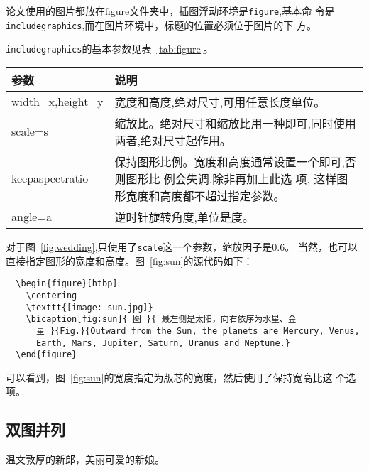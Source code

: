 论文使用的图片都放在figure文件夹中，插图浮动环境是\texttt{figure},基本命
令是\texttt{includegraphics},而在图片环境中，标题的位置必须位于图片的下
方。

\texttt{includegraphics}的基本参数见表~\ref{tab:figure}。

\begin{table}[htbp]
  \centering
  \vspace{0.2cm}
  \zhongwu
  \begin{tabularx}{0.8\textwidth{}}{lX}
    \toprule
    参数             & 说明 \\
    \midrule
    width=x,height=y & 宽度和高度,绝对尺寸,可用任意长度单位。                           \\
    scale=s          & 缩放比。绝对尺寸和缩放比用一种即可,同时使用两者,绝对尺寸起作用。 \\
    keepaspectratio & 保持图形比例。宽度和高度通常设置一个即可,否则图形比
    例会失调,除非再加上此选 项,
    这样图形宽度和高度都不超过指定参数。                                                \\
    angle=a          & 逆时针旋转角度,单位是度。                                        \\
    \bottomrule
  \end{tabularx}
\end{table}

对于图~\ref{fig:wedding},只使用了\texttt{scale}这一个参数，缩放因子是0.6。
当然，也可以直接指定图形的宽度和高度。图~\ref{fig:sun}的源代码如下：

\begin{lstlisting}
  \begin{figure}[htbp]
    \centering
    \texttt{[image: sun.jpg]}
    \bicaption[fig:sun]{ 图 }{ 最左侧是太阳，向右依序为水星、金
      星 }{Fig.}{Outward from the Sun, the planets are Mercury, Venus,
      Earth, Mars, Jupiter, Saturn, Uranus and Neptune.}
  \end{figure}
\end{lstlisting}

可以看到，图~\ref{fig:sun}的宽度指定为版芯的宽度，然后使用了保持宽高比这
个选项。


\subsection{双图并列}

温文敦厚的新郎，美丽可爱的新娘。

